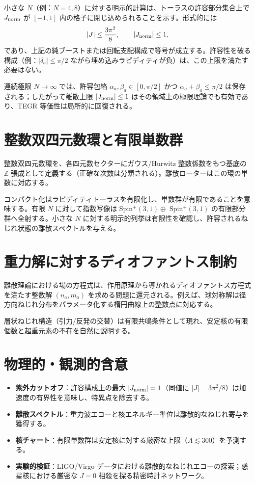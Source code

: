 \documentclass[dvipdfmx,11pt,a4paper]{article}
\newcommand{\Jnorm}{J_{\rm norm}}
\newcommand{\Jbound}{\frac{3\pi^2}{8}}
\begin{document}
小さな $N$（例：$N=4,8$）に対する明示的計算は、トーラスの許容部分集合上で $\Jnorm$ が $[-1,1]$ 内の格子に閉じ込められることを示す。形式的には
\[
|J| \leq \Jbound, \qquad |\Jnorm| \leq 1,
\]
であり、上記の純ブーストまたは回転支配構成で等号が成立する。許容性を破る構成（例：$|\delta_a|\leq\pi/2$ ながら埋め込みラピディティが負）は、この上限を満たす必要はない。

連続極限 $N \to \infty$ では、許容包絡 $\alpha_a,\beta_a\in[0,\pi/2]$ かつ $\alpha_a+\beta_a\leq\pi/2$ は保存される；したがって離散上限 $|\Jnorm|\leq 1$ はその領域上の極限理論でも有効であり、TEGR 等価性は局所的に回復される。

\section{整数双四元数環と有限単数群}
\label{sec:integer}

整数双四元数環を、各四元数セクターにガウス/Hurwitz 整数係数をもつ基底の $\mathbb{Z}$-張成として定義する（正確な次数は分類される）。離散ローターはこの環の単数に対応する。

コンパクト化はラピディティトーラスを有限化し、単数群が有限であることを意味する。有限 $N$ に対して指数写像は Spin$^+(3,1) \oplus$ Spin$^+(3,1)$ の有限部分群へ全射する。小さな $N$ に対する明示的列挙は有限性を確認し、許容されるねじれ状態の離散スペクトルを与える。

\section{重力解に対するディオファントス制約}
\label{sec:diophantine}

離散理論における場の方程式は、作用原理から導かれるディオファントス方程式を満たす整数解 $(n_a, m_a)$ を求める問題に還元される。例えば、球対称解は径方向ねじれ分布をパラメータ化する楕円曲線上の整数点に対応する。

層状ねじれ構造（引力/反発の交替）は有限共鳴条件として現れ、安定核の有限個数と超重元素の不在を自然に説明する。

\section{物理的・観測的含意}
\label{sec:implications}

\begin{itemize}
  \item \textbf{紫外カットオフ}：許容構成上の最大 $|\Jnorm| = 1$（同値に $|J| = 3\pi^2/8$）は加速度の有界性を意味し、特異点を除去する。
  \item \textbf{離散スペクトル}：重力波エコーと核エネルギー準位は離散的なねじれ寄与を獲得する。
  \item \textbf{核チャート}：有限単数群は安定核に対する厳密な上限（$A \lesssim 300$）を予測する。
  \item \textbf{実験的検証}：LIGO/Virgo データにおける離散的なねじれエコーの探索；惑星核における厳密な $J=0$ 相殺を探る精密時計ネットワーク。
\end{itemize}
\end{document}

